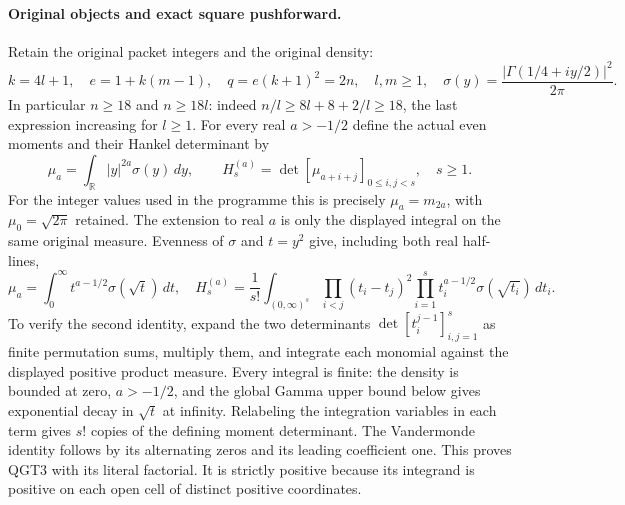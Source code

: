 \documentclass[11pt,a4paper]{article}
\begin{document}
\paragraph{Original objects and exact square pushforward.}
Retain the original packet integers and the original density:
\[
 k=4l+1,\quad e=1+k(m-1),\quad q=e(k+1)^2=2n,
 \quad l,m\ge1,\quad
 \sigma(y)=\frac{|\Gamma(1/4+iy/2)|^2}{2\pi}.
 \tag{QGT1}
\]
In particular $n\ge18$ and $n\ge18l$: indeed
$n/l\ge8l+8+2/l\ge18$, the last expression increasing for $l\ge1$.
For every real $a>-1/2$ define the actual even moments and their
Hankel determinant by
\[
 \mu_a=\int_{\mathbb R}|y|^{2a}\sigma(y)\,dy,
 \qquad H_s^{(a)}=\det[\mu_{a+i+j}]_{0\le i,j<s},\quad s\ge1.
 \tag{QGT2}
\]
For the integer values used in the programme this is precisely
$\mu_a=m_{2a}$, with $\mu_0=\sqrt{2\pi}$ retained. The extension to
real $a$ is only the displayed integral on the same original measure.
Evenness of $\sigma$ and $t=y^2$ give, including both real half-lines,
\[
 \mu_a=\int_0^\infty t^{a-1/2}\sigma(\sqrt t)\,dt,
 \quad
 H_s^{(a)}=\frac1{s!}\int_{(0,\infty)^s}
       \prod_{i<j}(t_i-t_j)^2
       \prod_{i=1}^s t_i^{a-1/2}\sigma(\sqrt{t_i})\,dt_i.
 \tag{QGT3}
\]
To verify the second identity, expand the two determinants
$\det[t_i^{j-1}]_{i,j=1}^s$ as finite permutation sums, multiply them,
and integrate each monomial against the displayed positive product
measure. Every integral is finite: the density is bounded at zero,
$a>-1/2$, and the global Gamma upper bound below gives exponential
decay in $\sqrt t$ at infinity. Relabeling the integration variables
in each term gives $s!$ copies of the defining moment determinant.
The Vandermonde identity follows by its alternating zeros and its
leading coefficient one. This proves QGT3 with its literal factorial.
It is strictly positive because its integrand is positive on each
open cell of distinct positive coordinates.
\end{document}
